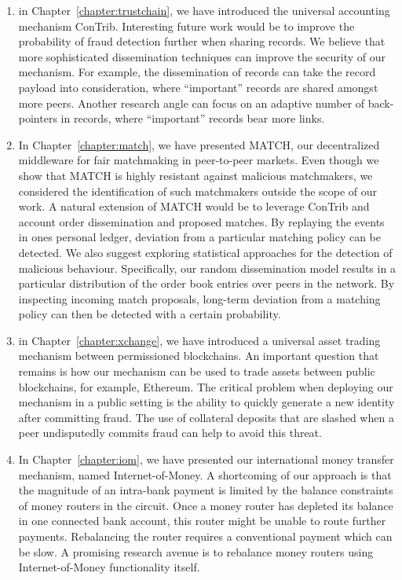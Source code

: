 \begin{enumerate}
	\item in Chapter~\ref{chapter:trustchain}, we have introduced the universal accounting mechanism ConTrib.
	Interesting future work would be to improve the probability of fraud detection further when sharing records.
	We believe that more sophisticated dissemination techniques can improve the security of our mechanism.
	For example, the dissemination of records can take the record payload into consideration, where \enquote{important} records are shared amongst more peers.
	Another research angle can focus on an adaptive number of back-pointers in records, where \enquote{important} records bear more links.
	
	\item In Chapter~\ref{chapter:match}, we have presented MATCH, our decentralized middleware for fair matchmaking in peer-to-peer markets.
	Even though we show that MATCH is highly resistant against malicious matchmakers, we considered the identification of such matchmakers outside the scope of our work.
	A natural extension of MATCH would be to leverage ConTrib and account order dissemination and proposed matches.
	By replaying the events in ones personal ledger, deviation from a particular matching policy can be detected.
	We also suggest exploring statistical approaches for the detection of malicious behaviour.
	Specifically, our random dissemination model results in a particular distribution of the order book entries over peers in the network.
	By inspecting incoming match proposals, long-term deviation from a matching policy can then be detected with a certain probability.
	
	\item in Chapter~\ref{chapter:xchange}, we have introduced a universal asset trading mechanism between permissioned blockchains.
	An important question that remains is how our mechanism can be used to trade assets between public blockchains, for example, Ethereum.
	The critical problem when deploying our mechanism in a public setting is the ability to quickly generate a new identity after committing fraud.
	The use of collateral deposits that are slashed when a peer undisputedly commits fraud can help to avoid this threat.
	
	\item In Chapter~\ref{chapter:iom}, we have presented our international money transfer mechanism, named Internet-of-Money.
	A shortcoming of our approach is that the magnitude of an intra-bank payment is limited by the balance constraints of money routers in the circuit.
	Once a money router has depleted its balance in one connected bank account, this router might be unable to route further payments.
	Rebalancing the router requires a conventional payment which can be slow.
	A promising research avenue is to rebalance money routers using Internet-of-Money functionality itself.
	

\end{enumerate}
